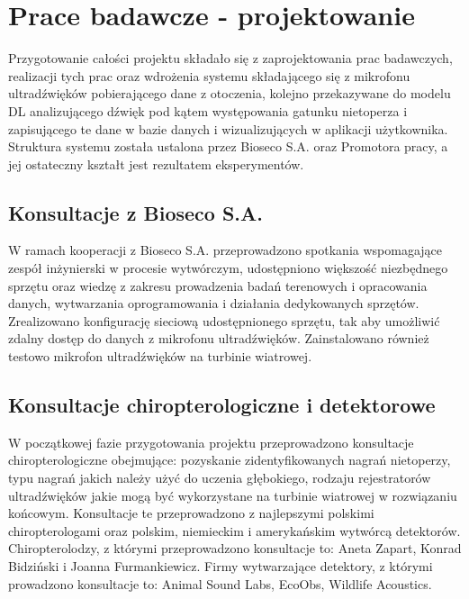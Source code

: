 \documentclass{sprz}
\begin{document}
\chapter{Prace badawcze - projektowanie}

Przygotowanie całości projektu składało się z zaprojektowania prac badawczych, realizacji tych prac oraz wdrożenia systemu składającego się z mikrofonu ultradźwięków pobierającego dane z otoczenia, kolejno przekazywane do modelu DL analizującego dźwięk pod kątem występowania gatunku nietoperza i zapisującego te dane w bazie danych i wizualizujących w aplikacji użytkownika. Struktura systemu została ustalona przez Bioseco S.A. oraz Promotora pracy, a jej ostateczny kształt jest rezultatem eksperymentów. 

\section{Konsultacje z Bioseco S.A.}
W ramach kooperacji z Bioseco S.A. przeprowadzono spotkania wspomagające zespół inżynierski w procesie wytwórczym, udostępniono większość niezbędnego sprzętu oraz wiedzę z zakresu prowadzenia badań terenowych i opracowania danych, wytwarzania oprogramowania i działania dedykowanych sprzętów. Zrealizowano konfigurację sieciową udostępnionego sprzętu, tak aby umożliwić zdalny dostęp do danych z mikrofonu ultradźwięków. Zainstalowano również testowo mikrofon ultradźwięków na turbinie wiatrowej.

\section{Konsultacje chiropterologiczne i detektorowe}
W początkowej fazie przygotowania projektu przeprowadzono konsultacje chiropterologiczne obejmujące: pozyskanie zidentyfikowanych nagrań nietoperzy, typu nagrań jakich należy użyć do uczenia głębokiego, rodzaju rejestratorów ultradźwięków jakie mogą być wykorzystane na turbinie wiatrowej w rozwiązaniu końcowym. Konsultacje te przeprowadzono z najlepszymi polskimi chiropterologami oraz polskim, niemieckim i amerykańskim wytwórcą detektorów. Chiropterolodzy, z którymi przeprowadzono konsultacje to: Aneta Zapart, Konrad Bidziński i Joanna Furmankiewicz. Firmy wytwarzające detektory, z którymi prowadzono konsultacje to: Animal Sound Labs, EcoObs, Wildlife Acoustics.
\end{document}
